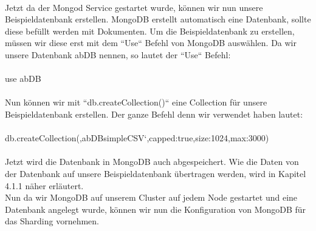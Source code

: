 \\
Jetzt da der Mongod Service gestartet wurde, k\"onnen wir nun unsere Beispieldatenbank erstellen. MongoDB erstellt automatisch eine Datenbank, sollte diese bef\"ullt werden mit Dokumenten. Um die Beispieldatenbank zu erstellen, m\"ussen wir diese erst mit dem “Use“ Befehl von MongoDB ausw\"ahlen. Da wir unsere Datenbank abDB nennen, so lautet der “Use“ Befehl:
\\
\\
use abDB
\\
\\
Nun k\"onnen wir mit ``db.createCollection()`` eine Collection f\"ur unsere Beispieldatenbank erstellen. Der ganze Befehl denn wir verwendet haben lautet:
\\
\\
db.createCollection(‚abDBsimpleCSV‘,{capped:true,size:1024,max:3000})
\\
\\
Jetzt wird die Datenbank in MongoDB auch abgespeichert. Wie die Daten von der Datenbank auf unsere Beispieldatenbank \"ubertragen werden, wird in Kapitel 4.1.1 n\"aher erl\"autert.
\\
Nun da wir MongoDB auf unserem Cluster auf jedem Node gestartet und eine Datenbank angelegt wurde, k\"onnen wir nun die Konfiguration von MongoDB f\"ur das Sharding vornehmen.\cite{mongo01}
